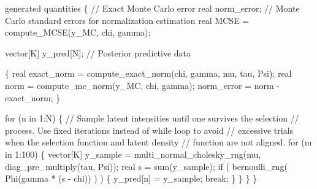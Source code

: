 \documentclass[
  letterpaper,
  DIV=11,
  numbers=noendperiod]{scrartcl}
\newenvironment{Shaded}{\begin{snugshade}}{\end{snugshade}}
\newcommand{\AttributeTok}[1]{\textcolor[rgb]{0.40,0.45,0.13}{#1}}
\newcommand{\CommentTok}[1]{\textcolor[rgb]{0.37,0.37,0.37}{#1}}
\newcommand{\ControlFlowTok}[1]{\textcolor[rgb]{0.00,0.23,0.31}{#1}}
\newcommand{\DataTypeTok}[1]{\textcolor[rgb]{0.68,0.00,0.00}{#1}}
\newcommand{\DecValTok}[1]{\textcolor[rgb]{0.68,0.00,0.00}{#1}}
\newcommand{\FunctionTok}[1]{\textcolor[rgb]{0.28,0.35,0.67}{#1}}
\newcommand{\KeywordTok}[1]{\textcolor[rgb]{0.00,0.23,0.31}{#1}}
\newcommand{\NormalTok}[1]{\textcolor[rgb]{0.00,0.23,0.31}{#1}}
\newcommand{\OtherTok}[1]{\textcolor[rgb]{0.00,0.23,0.31}{#1}}
\newcommand{\SpecialCharTok}[1]{\textcolor[rgb]{0.37,0.37,0.37}{#1}}
\newcommand{\StringTok}[1]{\textcolor[rgb]{0.13,0.47,0.30}{#1}}
\begin{document}
\begin{codelisting}
\begin{Shaded}
\begin{Highlighting}[]
\KeywordTok{generated quantities}\NormalTok{ \{}
  \CommentTok{// Exact Monte Carlo error}
  \DataTypeTok{real}\NormalTok{ norm\_error;}
  \CommentTok{// Monte Carlo standard errors for normalization estimation}
  \DataTypeTok{real}\NormalTok{ MCSE = compute\_MCSE(y\_MC, chi, gamma);}
  
  \DataTypeTok{vector}\NormalTok{[K] y\_pred[N]; }\CommentTok{// Posterior predictive data}
  
\NormalTok{  \{}
    \DataTypeTok{real}\NormalTok{ exact\_norm = compute\_exact\_norm(chi, gamma, mu, tau, Psi);}
    \DataTypeTok{real}\NormalTok{ norm = compute\_mc\_norm(y\_MC, chi, gamma);}
\NormalTok{    norm\_error = norm {-} exact\_norm;}
\NormalTok{  \}}

  \ControlFlowTok{for}\NormalTok{ (n }\ControlFlowTok{in} \DecValTok{1}\NormalTok{:N) \{}
    \CommentTok{// Sample latent intensities until one survives the selection}
    \CommentTok{// process.  Use fixed iterations instead of while loop to avoid }
    \CommentTok{// excessive trials when the selection function and latent density }
    \CommentTok{// function are not aligned.}
    \ControlFlowTok{for}\NormalTok{ (m }\ControlFlowTok{in} \DecValTok{1}\NormalTok{:}\DecValTok{100}\NormalTok{) \{}
      \DataTypeTok{vector}\NormalTok{[K] y\_sample}
\NormalTok{        = multi\_normal\_cholesky\_rng(mu, diag\_pre\_multiply(tau, Psi));}
      \DataTypeTok{real}\NormalTok{ s = sum(y\_sample);}
      \ControlFlowTok{if}\NormalTok{ ( bernoulli\_rng( Phi(gamma * (s {-} chi)) ) ) \{}
\NormalTok{        y\_pred[n] = y\_sample;}
        \ControlFlowTok{break}\NormalTok{;}
\NormalTok{      \}}
\NormalTok{    \}}
\NormalTok{  \}}
\NormalTok{\}}
\end{Highlighting}
\end{Shaded}

\end{codelisting}

\begin{Shaded}
\end{Shaded}
\end{document}
